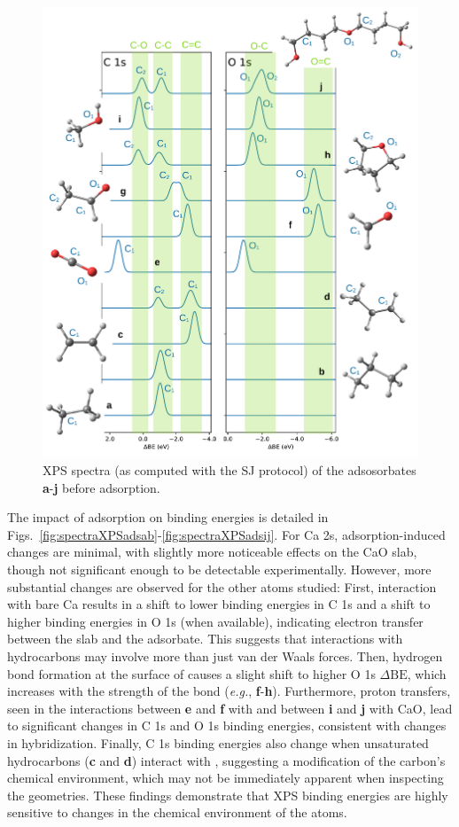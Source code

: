 \documentclass[12pt,a4paper]{article}
\def\dbe{\ensuremath{\Delta\text{BE}}}
\begin{document}
\begin{figure}[!h]
	\includegraphics[width=\linewidth]{Figure10}
	\caption{XPS spectra (as computed with the SJ protocol) of the adsosorbates \textbf{a}-\textbf{j} before adsorption.}
	\label{fig:adsorbare}
\end{figure}

\clearpage

The impact of adsorption on binding energies is detailed in Figs.~\ref{fig:spectraXPSadsab}-\ref{fig:spectraXPSadsij}. For Ca 2s, adsorption-induced changes are minimal, with slightly more noticeable effects on the CaO slab, though not significant enough to be detectable experimentally. However, more substantial changes are observed for the other atoms studied: 
First, interaction with bare Ca results in a shift to lower binding energies in C 1s and a shift to higher binding energies in O 1s (when available), indicating electron transfer between the slab and the adsorbate. This suggests that interactions with hydrocarbons may involve more than just van der Waals forces. Then, hydrogen bond formation at the surface of  causes a slight shift to higher O 1s \dbe{}, which increases with the strength of the bond (\textit{e.g.}, \textbf{f}-\textbf{h}).
Furthermore, proton transfers, seen in the interactions between \textbf{e} and \textbf{f} with  and between \textbf{i} and \textbf{j} with CaO, lead to significant changes in C 1s and O 1s binding energies, consistent with changes in hybridization. Finally, C 1s binding energies also change when unsaturated hydrocarbons (\textbf{c} and \textbf{d}) interact with , suggesting a modification of the carbon's chemical environment, which may not be immediately apparent when inspecting the geometries.
These findings demonstrate that XPS binding energies are highly sensitive to changes in the chemical environment of the atoms.
\end{document}
